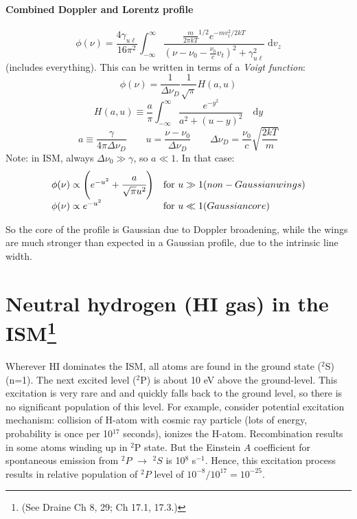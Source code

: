 \documentclass[11pt]{article}
\newcommand{\mar}[1]{\hspace{0pt}\marginpar{-\textcolor{black}{#1}-}}
\let\oldsection\section
\renewcommand\section{\clearpage\oldsection}
\begin{document}
\paragraph{Combined Doppler and Lorentz profile}
\[
    \phi(\nu)
    = \frac{4\gamma_{u\ell}}{16\pi^{2}} \int_{-\infty}^{\infty}{
        \frac{\frac{m}{2{\pi}kT}^{1/2} e^{-mv_{t}^{2} / 2kT } }
        { \left( \nu - \nu_{0} - \frac{\nu_{0}}{c} v_{t} \right) ^{2}
        + \gamma_{u\ell}^{2} } \;\mathrm{d}v_{z}}
    \]
(includes everything).
This can be written in terms of a \textit{Voigt function}:
\[
    \phi(\nu)
    = \frac{1}{\Delta\nu_{D}} \frac{1}{\sqrt{\pi}} H(a,u)
    \]
\[
    H(a,u) \equiv \frac{a}{\pi} \int_{-\infty}^{\infty}{
        \frac{e^{-y^{2}}}{a^{2}+(u-y)^{2}}\quad\mathrm{d}y }
    \]
\[
    a \equiv \frac{\gamma}{4\pi\Delta\nu_{D}} \qquad
    u = \frac{\nu-\nu_{0}}{\Delta\nu_{D}} \qquad
    \Delta\nu_{D} = \frac{\nu_{0}}{c} \sqrt{\frac{2kT}{m}}
    \]
Note: in ISM, always $\Delta\nu_{0} \gg \gamma$, so $a \ll 1$.
In that case:
\[
    \begin{array}{l l}
    \phi(\nu) \propto \left( e^{-u^{2}} + \cfrac{a}{\sqrt{\pi} u^{2}}
        \right) & \mathrm{for}\ u \gg 1 (non-Gaussian wings)\\
        \phi(\nu) \propto e^{-u^{2}} & \mathrm{for}\ u \ll 1 (Gaussian core)
    \end{array}
    \]

\mar{33}So the core of the profile is Gaussian due to Doppler broadening,
while the wings are much stronger than expected in a Gaussian profile,
due to the intrinsic line width.

\newpage
\section{Neutral hydrogen (HI gas) in the ISM\footnote{
    (See Draine Ch 8, 29; Ch 17.1, 17.3.)}}

Wherever HI dominates the ISM, all atoms are found in the ground state
($^{2}$S)(n=1). The next excited level ($^{2}$P) is about 10 eV above the
ground-level. This excitation is very rare and and quickly falls back to the
ground level, so there is no significant population of this level. For example,
consider potential excitation mechanism: collision of H-atom with cosmic ray
particle (lots of energy, probability is once per 10$^{17}$ seconds), ionizes
the H-atom. Recombination results in some atoms winding up in $^{2}$P state.
But the Einstein $A$ coefficient for spontaneous emission from $^{2}P$
$\rightarrow$ $^{2}S$ is 10$^{8}$ s$^{-1}$. Hence, this excitation process
results in relative population of $^{2}P$ level of $10^{-8}/10^{17} =
10^{-25}$.
\end{document}
